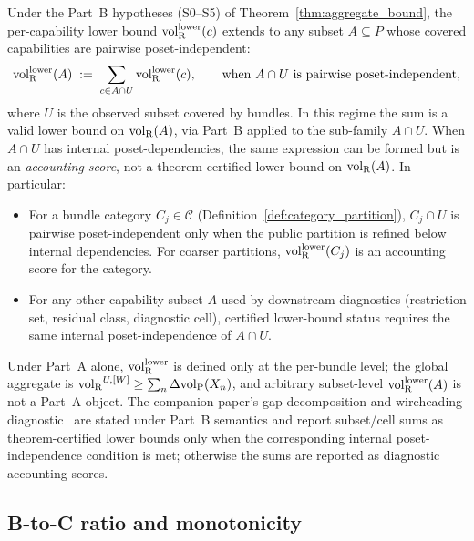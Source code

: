 \begin{definition}
\label{def:volRlower_subset}
Under the Part~B hypotheses (S0--S5) of
Theorem~\ref{thm:aggregate_bound}, the per-capability lower
bound ${\operatorname{vol}_{\mathrm{R}}^{\mathrm{lower}}}(c)$ extends to any subset $A \subseteq P$
whose covered capabilities are pairwise poset-independent:
\[
  {\operatorname{vol}_{\mathrm{R}}^{\mathrm{lower}}}(A) \;:=\; \sum_{c \in A \cap U} {\operatorname{vol}_{\mathrm{R}}^{\mathrm{lower}}}(c),
  \qquad \text{when } A \cap U \text{ is pairwise
  poset-independent,}
\]
where $U$ is the observed subset covered by bundles.  In this
regime the sum is a valid lower bound on ${\operatorname{vol}_{\mathrm{R}}}(A)$, via
Part~B applied to the sub-family $A \cap U$.  When $A \cap U$
has internal poset-dependencies, the same expression can be
formed but is an \emph{accounting score}, not a
theorem-certified lower bound on ${\operatorname{vol}_{\mathrm{R}}}(A)$.  In particular:
\begin{itemize}
\item For a bundle category $C_j \in \mathcal{C}$
  (Definition~\ref{def:category_partition}), $C_j \cap U$ is
  pairwise poset-independent only when the public partition is
  refined below internal dependencies.  For coarser partitions,
  ${\operatorname{vol}_{\mathrm{R}}^{\mathrm{lower}}}(C_j)$ is an accounting score for the category.
\item For any other capability subset $A$ used by downstream
  diagnostics (restriction set, residual class, diagnostic
  cell), certified lower-bound status requires the same
  internal poset-independence of $A \cap U$.
\end{itemize}
Under Part~A alone, ${\operatorname{vol}_{\mathrm{R}}^{\mathrm{lower}}}$ is defined only at the
per-bundle level; the global aggregate is ${\operatorname{vol}_{\mathrm{R}}}^{U,[W]} \geq \sum_n
\Delta{\operatorname{vol}_{\mathrm{P}}}(X_n)$, and arbitrary subset-level ${\operatorname{vol}_{\mathrm{R}}^{\mathrm{lower}}}(A)$
is not a Part~A object.  The companion paper's gap decomposition
and wireheading diagnostic~\citep[Need~Sufficiency]{lasser2026paper8b} are stated
under Part~B semantics and report subset/cell sums as
theorem-certified lower bounds only when the corresponding
internal poset-independence condition is met; otherwise the
sums are reported as diagnostic accounting scores.
\end{definition}

\subsection{B-to-C ratio and monotonicity}

